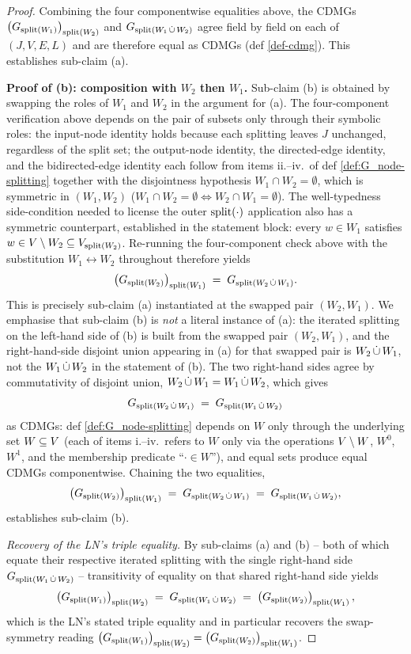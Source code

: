 \documentclass[main]{subfiles}
\begin{document}
\begin{proof}
\smallskip
Combining the four componentwise equalities above, the CDMGs $\left ( G_{\mathrm{split}(W_1)} \right )_{\mathrm{split}(W_2)}$ and $G_{\mathrm{split}(W_1 \,\dot{\cup}\, W_2)}$ agree field by field on each of $(J, V, E, L)$ and are therefore equal as CDMGs (def \ref{def-cdmg}). This establishes sub-claim (a).

\medskip\noindent\textbf{Proof of (b): composition with $W_2$ then $W_1$.}
Sub-claim (b) is obtained by swapping the roles of $W_1$ and $W_2$ in the argument for (a). The four-component verification above depends on the pair of subsets only through their symbolic roles: the input-node identity holds because each splitting leaves $J$ unchanged, regardless of the split set; the output-node identity, the directed-edge identity, and the bidirected-edge identity each follow from items ii.--iv.\ of def \ref{def:G_node-splitting} together with the disjointness hypothesis $W_1 \cap W_2 = \emptyset$, which is symmetric in $(W_1, W_2)$ ($W_1 \cap W_2 = \emptyset \Leftrightarrow W_2 \cap W_1 = \emptyset$). The well-typedness side-condition needed to license the outer $\mathrm{split}(\cdot)$ application also has a symmetric counterpart, established in the statement block: every $w \in W_1$ satisfies $w \in V \setminus W_2 \subseteq V_{\mathrm{split}(W_2)}$. Re-running the four-component check above with the substitution $W_1 \leftrightarrow W_2$ throughout therefore yields
\[
    \left ( G_{\mathrm{split}(W_2)} \right )_{\mathrm{split}(W_1)} \;=\; G_{\mathrm{split}(W_2 \,\dot{\cup}\, W_1)}.
\]
This is precisely sub-claim (a) instantiated at the swapped pair $(W_2, W_1)$. We emphasise that sub-claim (b) is \emph{not} a literal instance of (a): the iterated splitting on the left-hand side of (b) is built from the swapped pair $(W_2, W_1)$, and the right-hand-side disjoint union appearing in (a) for that swapped pair is $W_2 \,\dot{\cup}\, W_1$, not the $W_1 \,\dot{\cup}\, W_2$ in the statement of (b). The two right-hand sides agree by commutativity of disjoint union, $W_2 \,\dot{\cup}\, W_1 = W_1 \,\dot{\cup}\, W_2$, which gives
\[
    G_{\mathrm{split}(W_2 \,\dot{\cup}\, W_1)} \;=\; G_{\mathrm{split}(W_1 \,\dot{\cup}\, W_2)}
\]
as CDMGs: def \ref{def:G_node-splitting} depends on $W$ only through the underlying set $W \subseteq V$ (each of items i.--iv.\ refers to $W$ only via the operations $V \setminus W$, $W^0$, $W^1$, and the membership predicate ``$\cdot \in W$''), and equal sets produce equal CDMGs componentwise. Chaining the two equalities,
\[
    \left ( G_{\mathrm{split}(W_2)} \right )_{\mathrm{split}(W_1)} \;=\; G_{\mathrm{split}(W_2 \,\dot{\cup}\, W_1)} \;=\; G_{\mathrm{split}(W_1 \,\dot{\cup}\, W_2)},
\]
establishes sub-claim (b).

\medskip\noindent\emph{Recovery of the LN's triple equality.}
By sub-claims (a) and (b) -- both of which equate their respective iterated splitting with the single right-hand side $G_{\mathrm{split}(W_1 \,\dot{\cup}\, W_2)}$ -- transitivity of equality on that shared right-hand side yields
\[
    \left ( G_{\mathrm{split}(W_1)} \right )_{\mathrm{split}(W_2)} \;=\; G_{\mathrm{split}(W_1 \,\dot{\cup}\, W_2)} \;=\; \left ( G_{\mathrm{split}(W_2)} \right )_{\mathrm{split}(W_1)},
\]
which is the LN's stated triple equality and in particular recovers the swap-symmetry reading $\left ( G_{\mathrm{split}(W_1)} \right )_{\mathrm{split}(W_2)} = \left ( G_{\mathrm{split}(W_2)} \right )_{\mathrm{split}(W_1)}$.
\end{proof}
\end{document}
